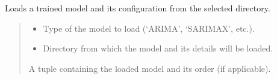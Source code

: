 \documentclass[letterpaper,10pt,english]{sphinxmanual}
\begin{document}
\begin{fulllineitems}
\label{\detokenize{docs/utilities:utilities.load_trained_model}}
\pysigstartsignatures
{}
\pysigstopsignatures
\sphinxAtStartPar
Loads a trained model and its configuration from the selected directory.
\begin{quote}\begin{description}
\begin{itemize}
\item {} 
\sphinxAtStartPar
{} \textendash{} Type of the model to load (‘ARIMA’, ‘SARIMAX’, etc.).

\item {} 
\sphinxAtStartPar
{} \textendash{} Directory from which the model and its details will be loaded.

\end{itemize}

\sphinxAtStartPar
A tuple containing the loaded model and its order (if applicable).

\end{description}\end{quote}

\end{fulllineitems}

\end{document}
